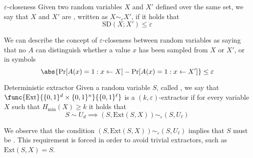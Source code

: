 \documentclass[a4paper, 12pt]{report}
\begin{document}
\begin{frameddefn}{$\varepsilon$-closeness}
	Given two random variables $X$ and $X'$ defined over the same set, we say that $X$ and $X'$ are , written as $X \sim_\varepsilon X'$, if it holds that $$\mbox{SD}(X; X') \le \varepsilon$$
\end{frameddefn}

We can describe the concept of $\varepsilon$-closeness between random variables as saying that no  $A$ can distinguish whether a value $x$ has been sampled from $X$ or $X'$, or in symbols $$\abs{\Pr[A(x) = 1 : x \leftarrow X] - \Pr[A(x) = 1: x \leftarrow X']} \le \varepsilon$$

\begin{frameddefn}{Deterministic extractor}
	Given a random variable $S$, called , we say that $\func{\mbox{Ext}}{\{0, 1\}^d \times \{0, 1\}^n}{\{0, 1\}^\ell}$ is a $(k, \varepsilon)$-extractor if for every variable $X$ such that $H_\mathrm{min}(X) \ge k$ it holds that $$S \sim U_d \implies (S, \mathrm{Ext}(S, X)) \sim_\varepsilon (S, U_\ell)$$
\end{frameddefn}

We observe that the condition $(S, \mathrm{Ext}(S, X)) \sim_\varepsilon (S, U_\ell)$ implies that $S$ must be  . This requirement is forced in order to avoid trivial extractors, such as $\mbox{Ext}(S, X) = S$.

\end{document}
